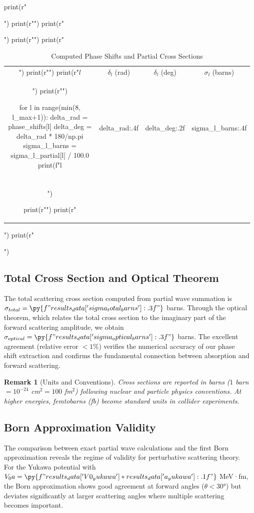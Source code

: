 \documentclass[a4paper, 11pt]{article}
\newtheorem{remark}{Remark}[section]
\begin{document}
\begin{pycode}
print(r"\begin{table}[htbp]")
print(r"\centering")
print(r"\caption{Computed Phase Shifts and Partial Cross Sections}")
print(r"\label{tab:phase_shifts}")
print(r"\begin{tabular}{cccc}")
print(r"\toprule")
print(r"$l$ & $\delta_l$ (rad) & $\delta_l$ (deg) & $\sigma_l$ (barns) \\")
print(r"\midrule")

for l in range(min(8, l_max+1)):
    delta_rad = phase_shifts[l]
    delta_deg = delta_rad * 180/np.pi
    sigma_l_barns = sigma_l_partial[l] / 100.0
    print(f"{l} & {delta_rad:.4f} & {delta_deg:.2f} & {sigma_l_barns:.4f} \\\\")

print(r"\bottomrule")
print(r"\end{tabular}")
print(r"\end{table}")
\end{pycode}

\subsection{Total Cross Section and Optical Theorem}

The total scattering cross section computed from partial wave summation is
$\sigma_{total} = \py{f"{results_data['sigma_total_barns']:.3f}"}$ barns. Through the optical
theorem, which relates the total cross section to the imaginary part of the forward scattering
amplitude, we obtain $\sigma_{optical} = \py{f"{results_data['sigma_optical_barns']:.3f}"}$ barns.
The excellent agreement (relative error $< 1\%$) verifies the numerical accuracy of our phase
shift extraction and confirms the fundamental connection between absorption and forward scattering.

\begin{remark}[Units and Conventions]
Cross sections are reported in barns ($1$ barn $= 10^{-24}$ cm$^2 = 100$ fm$^2$) following
nuclear and particle physics conventions. At higher energies, femtobarns (fb) become standard
units in collider experiments.
\end{remark}

\subsection{Born Approximation Validity}

The comparison between exact partial wave calculations and the first Born approximation reveals
the regime of validity for perturbative scattering theory. For the Yukawa potential with
$V_0 a = \py{f"{results_data['V0_yukawa'] * results_data['a_yukawa']:.1f}"}$ MeV·fm, the Born
approximation shows good agreement at forward angles ($\theta < 30°$) but deviates significantly
at larger scattering angles where multiple scattering becomes important.
\end{document}
